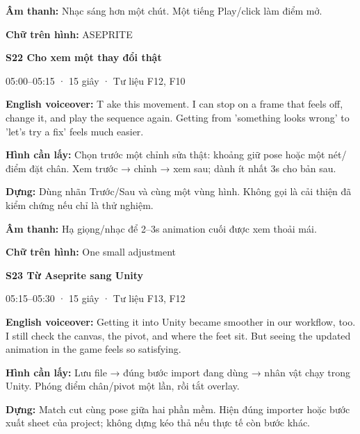 \documentclass[10pt,a4paper]{article}
\begin{document}
\textbf{Âm thanh:}  Nhạc sáng hơn một chút. Một tiếng Play/click làm điểm mở.\par

\textbf{Chữ trên hình:}  ASEPRITE\par

\textbf{S22 Cho xem một thay đổi thật}\par

05:00–05:15 · 15 giây · Tư liệu F12, F10\par

\textbf{English voiceover:}  T ake this movement. I can stop on a frame that feels off, change it, and play the sequence again. Getting from ’something looks wrong’ to ’let’s try a fix’ feels much easier.\par

\textbf{Hình cần lấy:}  Chọn trước một chỉnh sửa thật: khoảng giữ pose hoặc một nét/điểm đặt chân. Xem trước → chỉnh → xem sau; dành ít nhất 3s cho bản sau.\par

\textbf{Dựng:}  Dùng nhãn Trước/Sau và cùng một vùng hình. Không gọi là cải thiện đã kiểm chứng nếu chỉ là thử nghiệm.\par

\textbf{Âm thanh:}  Hạ giọng/nhạc để 2–3s animation cuối được xem thoải mái.\par

\textbf{Chữ trên hình:}  One small adjustment\par

\textbf{S23 Từ Aseprite sang Unity}\par

05:15–05:30 · 15 giây · Tư liệu F13, F12\par

\textbf{English voiceover:}  Getting it into Unity became smoother in our workflow, too. I still check the canvas, the pivot, and where the feet sit. But seeing the updated animation in the game feels so satisfying.\par

\textbf{Hình cần lấy:}  Lưu file → đúng bước import đang dùng → nhân vật chạy trong Unity. Phóng điểm chân/pivot một lần, rồi tắt overlay.\par

\textbf{Dựng:}  Match cut cùng pose giữa hai phần mềm. Hiện đúng importer hoặc bước xuất sheet của project; không dựng kéo thả nếu thực tế còn bước khác.\par
\end{document}

